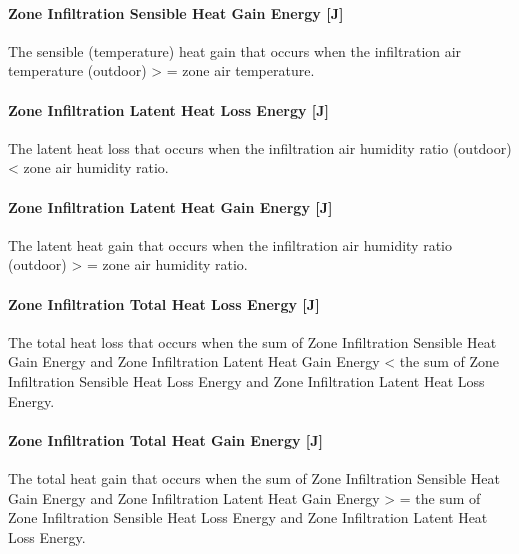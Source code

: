 \paragraph{Zone Infiltration Sensible Heat Gain Energy {[}J{]}}\label{zone-infiltration-sensible-heat-gain-energy-j}

The sensible (temperature) heat gain that occurs when the infiltration air temperature (outdoor) \textgreater{} = zone air temperature.

\paragraph{Zone Infiltration Latent Heat Loss Energy {[}J{]}}\label{zone-infiltration-latent-heat-loss-energy-j}

The latent heat loss that occurs when the infiltration air humidity ratio (outdoor) \textless{} zone air humidity ratio.

\paragraph{Zone Infiltration Latent Heat Gain Energy {[}J{]}}\label{zone-infiltration-latent-heat-gain-energy-j}

The latent heat gain that occurs when the infiltration air humidity ratio (outdoor) \textgreater{} = zone air humidity ratio.

\paragraph{Zone Infiltration Total Heat Loss Energy {[}J{]}}\label{zone-infiltration-total-heat-loss-energy-j}

The total heat loss that occurs when the sum of Zone Infiltration Sensible Heat Gain Energy and Zone Infiltration Latent Heat Gain Energy \textless{} the sum of Zone Infiltration Sensible Heat Loss Energy and Zone Infiltration Latent Heat Loss Energy.

\paragraph{Zone Infiltration Total Heat Gain Energy {[}J{]}}\label{zone-infiltration-total-heat-gain-energy-j}

The total heat gain that occurs when the sum of Zone Infiltration Sensible Heat Gain Energy and Zone Infiltration Latent Heat Gain Energy \textgreater{} = the sum of Zone Infiltration Sensible Heat Loss Energy and Zone Infiltration Latent Heat Loss Energy.

